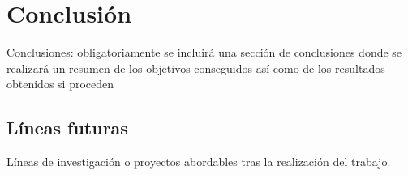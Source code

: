 
\chapter{Conclusión} 
\label{ch:method}

Conclusiones: obligatoriamente se incluirá una sección de conclusiones donde se
realizará un resumen de los objetivos conseguidos así como de los resultados
obtenidos si proceden

\section{Líneas futuras}

Líneas de investigación o proyectos abordables tras la realización del trabajo.